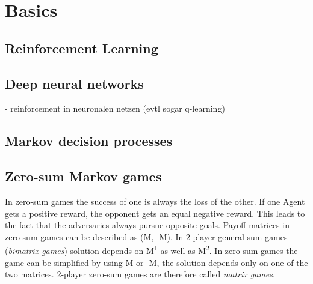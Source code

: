\begin{comment}
THOMY:

- Basics?
was rein?
	- reinforcement learning? - auf jeden fall
    - deep neural networks? - deep reinforcement learning (reinforcement mit neuronalen netzen) (q-learning)
    - value network vs policy network - nein
    - monte-carlo-search-trees - nein
    - PPO (proximal policy optimization) -nein
    - zero sum games (!) - definition - konsistente notation 
    
    - Formeln (markov decision processes)

\end{comment}

\section{Basics}
\label{Basics}

\subsection{Reinforcement Learning}

\subsection{Deep neural networks}
- reinforcement in neuronalen netzen (evtl sogar q-learning)

\subsection{Markov decision processes}
\label{mdp}



\subsection{Zero-sum Markov games}
\label{zerosumgames}

In zero-sum games the success of one is always the loss of the other. If one Agent gets a positive reward, the opponent gets an equal negative reward. This leads to the fact that the adversaries always pursue opposite goals. Payoff matrices in zero-sum games can be described as (M, -M).  In 2-player general-sum games (\textit{bimatrix games}) solution depends on M\textsuperscript{1} as well as M\textsuperscript{2}. In zero-sum games the game can be simplified by using M or -M, the solution depends only on one of the two matrices. 2-player zero-sum games are therefore called \textit{matrix games}\cite{basics2hu1998multiagent}.

